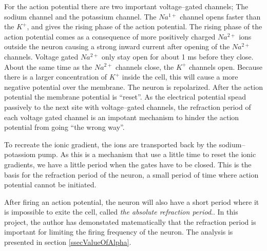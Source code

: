 For the action potential there are two important voltage--gated channels; The sodium channel and the potassium channel.
The $Na^{1+}$ channel opens faster than the $K^+$, and gives the rising phase of the action potential.
The rising phase of the action potential comes as a consequence of more positively charged $Na^{2+}$ ions outside the neuron causing a strong inward current after opening of the $Na^{2+}$ channels.
Voltage gated $Na^{2+}$ only stay open for about 1 ms before they close.
About the same time as the $Na^{2+}$ channels close, the $K^+$ channels open. 
Because there is a larger concentration of $K^+$ inside the cell, this will cause a more negative potential over the membrane. The neuron is repolarized.
After the action potential the membrane potential is ``reset''.
As the electrical potential spead passively to the next site with voltage--gated channels, 
	the refraction period of each voltage gated channel is an impotant mechanism to hinder the action potential from going ``the wrong way''\cite{NeuroscienceExploringTheBrain3edKAP4}\cite{PrinciplesOfNeuralScience4edKAP09}.

To recreate the ionic gradient, the ions are transported back by the sodium--potassiom pump.
As this is a mechanism that use a little time to reset the ionic gradients, we have a little period when the gates have to be closed.
This is the basis for the refraction period of the neuron, a small period of time where action potential cannot be initiated\cite{NeuroscienceExploringTheBrain3edKAP4}.

After firing an action potential, the neuron will also have a short period where it is impossible to exite the cell, called \emph{the absolute refraction period}\cite{PrinciplesOfNeuralScience4edKAP09}.. 
In this project, the author has demonstated matematically that the refraction period is important for limiting the firing frequency of the neuron. 
The analysis is presented in section \ref{ssecValueOfAlpha}.


